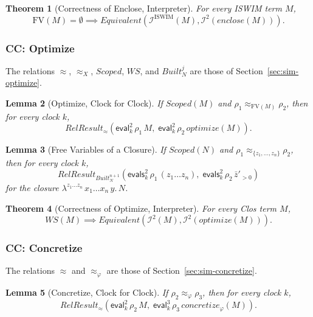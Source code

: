 \documentclass[10pt]{article}
\theoremstyle{acmplain}
\newtheorem{theorem}{Theorem}[section]
\newtheorem{lemma}[theorem]{Lemma}
\newcommand{\key}[1]{\mathsf{#1}}
\newcommand{\pass}[1]{\mathit{#1}}
\newcommand{\clos}[2]{\lambda^{#1}\, #2.\,}
\newcommand{\FV}{\mathrm{FV}}
\newcommand{\Equiv}{\mathit{Equivalent}}
\newcommand{\RelRes}[1]{\mathit{RelResult}_{#1}}
\newcommand{\EV}[2]{\key{eval}^{#1}_{#2}}
\newcommand{\EVS}[2]{\key{evals}^{#1}_{#2}}
\newcommand{\Interp}[1]{\mathcal{I}^{#1}}
\begin{document}
\begin{theorem}[Correctness of Enclose, Interpreter]\label{thm:enclose-clk}
For every ISWIM term $M$,
\[
  \FV(M) = \emptyset \implies
  \Equiv(\Interp{\mathrm{ISWIM}}(M), \Interp{2}(\pass{enclose}(M))) .
\]
\end{theorem}

\subsubsection{CC: Optimize}

The relations $\approx$, $\approx_X$, $\mathit{Scoped}$, $\mathit{WS}$, and
$\mathit{Built}^j_N$ are those of Section~\ref{sec:sim-optimize}.

\begin{lemma}[Optimize, Clock for Clock]\label{lem:optimize-clk}
If $\mathit{Scoped}(M)$ and $\rho_1 \approx_{\FV(M)} \rho_2$, then for every clock $k$,
\[
  \RelRes{\approx}(\EV{2}{k}\,\rho_1\,M,\; \EV{2}{k}\,\rho_2\,\pass{optimize}(M)) .
\]
\end{lemma}

\begin{lemma}[Free Variables of a Closure]\label{lem:prune-clk}
If $\mathit{Scoped}(N)$ and $\rho_1 \approx_{\{z_1, \ldots, z_n\}} \rho_2$,
then for every clock $k$,
\[
  \RelRes{\mathit{Built}^{n+1}_N}(\EVS{2}{k}\,\rho_1\,(z_1 \ldots z_n),\;
    \EVS{2}{k}\,\rho_2\,\bar{z}'_{>0})
\]
for the closure $\clos{z_1 \ldots z_n}{x_1 \ldots x_n\, y} N$.
\end{lemma}

\begin{theorem}[Correctness of Optimize, Interpreter]\label{thm:optimize-clk}
For every Clos term $M$,
\[
  \mathit{WS}(M) \implies \Equiv(\Interp{2}(M), \Interp{2}(\pass{optimize}(M))) .
\]
\end{theorem}

\subsubsection{CC: Concretize}

The relations $\approx$ and $\approx_\varphi$ are those of Section~\ref{sec:sim-concretize}.

\begin{lemma}[Concretize, Clock for Clock]\label{lem:concretize-clk}
If $\rho_2 \approx_\varphi \rho_3$, then for every clock $k$,
\[
  \RelRes{\approx}(\EV{2}{k}\,\rho_2\,M,\; \EV{3}{k}\,\rho_3\,\pass{concretize}_\varphi(M)) .
\]
\end{lemma}
\end{document}
